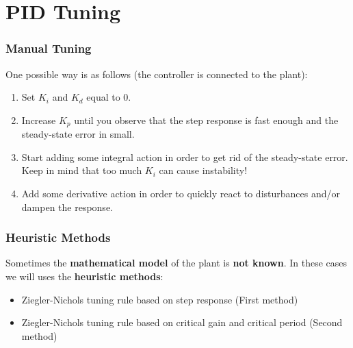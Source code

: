 \section{PID Tuning}


\begin{frame}
	\frametitle{Manual Tuning}
	One possible way is as follows (the controller is connected to the plant):
	\begin{enumerate}
		\item Set $K_i$ and $K_d$ equal to 0.
		\item Increase $K_p$ until you observe that the step response is fast enough and the steady-state error in small.
		\item Start adding some integral action in order to get rid of the steady-state error. Keep in mind that too much $K_i$ can cause instability!
		\item Add some derivative action in order to quickly react to disturbances and/or dampen the response.
	\end{enumerate}
\end{frame}

\begin{frame}
	\frametitle{Heuristic Methods}
	Sometimes the \textbf{mathematical model} of the plant is \textbf{not known}. In these cases we will uses the \textbf{heuristic methods}:
	\begin{itemize}
		\item Ziegler-Nichols tuning rule based on step response (First method)
		\item Ziegler-Nichols tuning rule based on critical gain and critical period (Second method)
	\end{itemize}
\end{frame}

